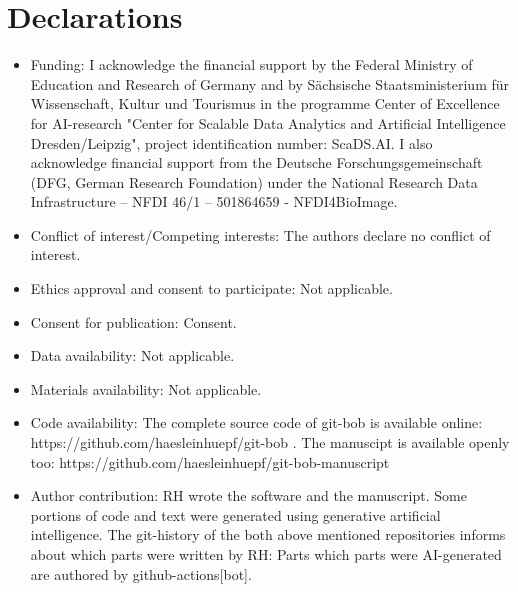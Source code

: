 \documentclass[sn-mathphys-num]{sn-jnl}%
\theoremstyle{thmstyleone}%
\theoremstyle{thmstyletwo}%
\theoremstyle{thmstylethree}%
\begin{document}
\section*{Declarations}

\begin{itemize}
\item Funding: I acknowledge the financial support by the Federal Ministry of Education and Research of Germany and by Sächsische Staatsministerium für Wissenschaft, Kultur und Tourismus in the programme Center of Excellence for AI-research "Center for Scalable Data Analytics and Artificial Intelligence Dresden/Leipzig", project identification number: ScaDS.AI. I also acknowledge financial support from the Deutsche Forschungsgemeinschaft (DFG, German Research Foundation) under the National Research Data Infrastructure – NFDI 46/1 – 501864659 - NFDI4BioImage.
\item Conflict of interest/Competing interests: The authors declare no conflict of interest.
\item Ethics approval and consent to participate: Not applicable.
\item Consent for publication: Consent.
\item Data availability: Not applicable.
\item Materials availability: Not applicable.
\item Code availability: The complete source code of git-bob is available online: https://github.com/haesleinhuepf/git-bob . The manuscipt is available openly too: https://github.com/haesleinhuepf/git-bob-manuscript
\item Author contribution: RH wrote the software and the manuscript. Some portions of code and text were generated using generative artificial intelligence. The git-history of the both above mentioned repositories informs about which parts were written by RH: Parts which parts were AI-generated are authored by github-actions[bot].
\end{itemize}

\noindent

\bigskip

\end{document}
